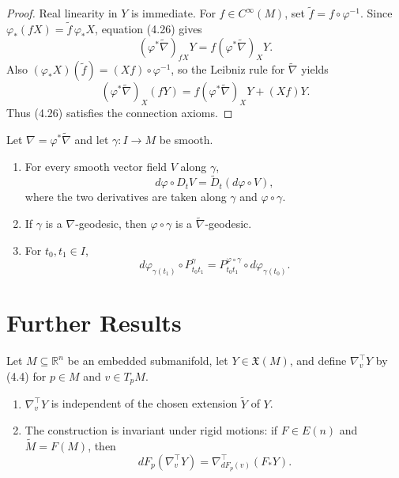 \begin{proof}
\sketch Real linearity in $Y$ is immediate. For $f\in C^\infty(M)$, set
$\widetilde f=f\circ\varphi^{-1}$. Since
$\varphi_*(fX)=\widetilde f\,\varphi_*X$, equation (4.26) gives
\[
(\varphi^*\widetilde\nabla)_{fX}Y
=f(\varphi^*\widetilde\nabla)_XY.
\]
Also $(\varphi_*X)(\widetilde f)=(Xf)\circ\varphi^{-1}$, so the Leibniz rule for
$\widetilde\nabla$ yields
\[
(\varphi^*\widetilde\nabla)_X(fY)
=f(\varphi^*\widetilde\nabla)_XY+(Xf)Y.
\]
Thus (4.26) satisfies the connection axioms.
\end{proof}

\begin{proposition}
\label{prop:pullback-connection-properties}
\leanok
Let $\nabla=\varphi^*\widetilde\nabla$ and let $\gamma\colon I\to M$ be smooth.
\begin{enumerate}
\item[(a)] For every smooth vector field $V$ along $\gamma$,
\[
d\varphi\circ D_tV=\widetilde D_t(d\varphi\circ V),
\]
where the two derivatives are taken along $\gamma$ and $\varphi\circ\gamma$.
\item[(b)] If $\gamma$ is a $\nabla$-geodesic, then $\varphi\circ\gamma$ is a
$\widetilde\nabla$-geodesic.
\item[(c)] For $t_0,t_1\in I$,
\[
d\varphi_{\gamma(t_1)}\circ P_{t_0t_1}^\gamma
=P_{t_0t_1}^{\varphi\circ\gamma}\circ d\varphi_{\gamma(t_0)}.
\]
\end{enumerate}
\end{proposition}
\section{Further Results}

\begin{proposition}
\label{prop:embedded-submanifold-covariant-derivative}
Let $M\subseteq\mathbb R^n$ be an embedded submanifold, let
$Y\in\mathfrak X(M)$, and define $\nabla_v^\top Y$ by (4.4) for
$p\in M$ and $v\in T_pM$.
\begin{enumerate}
\item[(a)] $\nabla_v^\top Y$ is independent of the chosen extension
$\widetilde Y$ of $Y$.
\item[(b)] The construction is invariant under rigid motions: if $F\in E(n)$ and
$\widetilde M=F(M)$, then
\[
dF_p(\nabla_v^\top Y)=\nabla_{dF_p(v)}^\top(F_*Y).
\]
\end{enumerate}
\end{proposition}


